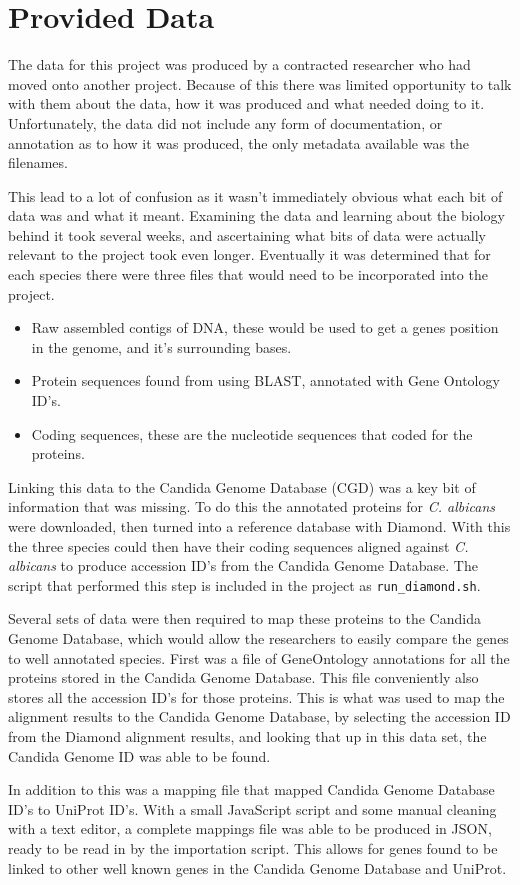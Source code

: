 \section{Provided Data}
The data for this project was produced by a contracted researcher who had moved onto another project. Because of this there was limited opportunity to talk with them about the data, how it was produced and what needed doing to it. Unfortunately, the data did not include any form of documentation, or annotation as to how it was produced, the only metadata available was the filenames. 

This lead to a lot of confusion as it wasn't immediately obvious what each bit of data was and what it meant. Examining the data and learning about the biology behind it took several weeks, and ascertaining what bits of data were actually relevant to the project took even longer. Eventually it was determined that for each species there were three files that would need to be incorporated into the project.

\begin{itemize}
  \item Raw assembled contigs of DNA, these would be used to get a genes position in the genome, and it's surrounding bases. 
  \item Protein sequences found from using BLAST, annotated with Gene Ontology ID's.
  \item Coding sequences, these are the nucleotide sequences that coded for the proteins. 
\end{itemize}

Linking this data to the Candida Genome Database (CGD) was a key bit of information that was missing. To do this the annotated proteins\cite{albicans} for \textit{C. albicans} were downloaded, then turned into a reference database with Diamond. With this the three species could then have their coding sequences aligned against \textit{C. albicans} to produce accession ID's from the Candida Genome Database. The script that performed this step is included in the project as \texttt{run\_diamond.sh}.

Several sets of data were then required to map these proteins to the Candida Genome Database, which would allow the researchers to easily compare the genes to well annotated species. First was a file of GeneOntology\cite{geneontology} annotations for all the proteins stored in the Candida Genome Database\cite{cgd-proteins}. This file conveniently also stores all the accession ID's for those proteins. This is what was used to map the alignment results to the Candida Genome Database, by selecting the accession ID from the Diamond alignment results, and looking that up in this data set, the Candida Genome ID was able to be found.

In addition to this was a mapping file that mapped Candida Genome Database ID's to UniProt\cite{uniprot} ID's. With a small JavaScript script and some manual cleaning with a text editor, a complete mappings file was able to be produced in JSON, ready to be read in by the importation script. This allows for genes found to be linked to other well known genes in the Candida Genome Database and UniProt.
